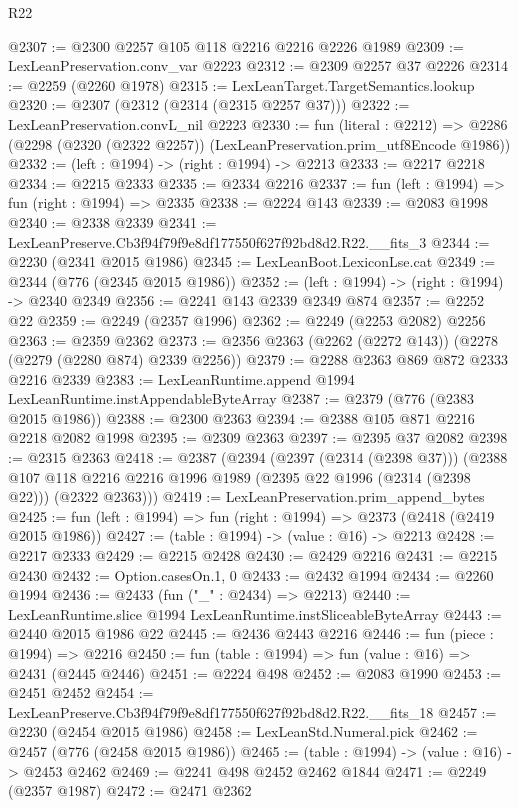 \begin{lexlean}{R22}
\begin{coremodule}
@2307 := @2300 @2257 @105 @118 @2216 @2216 @2226 @1989
@2309 := LexLeanPreservation.conv_var @2223
@2312 := @2309 @2257 @37 @2226
@2314 := @2259 (@2260 @1978)
@2315 := LexLeanTarget.TargetSemantics.lookup
@2320 := @2307 (@2312 (@2314 (@2315 @2257 @37)))
@2322 := LexLeanPreservation.convL_nil @2223
@2330 := fun (literal : @2212) =>
  @2286 (@2298 (@2320 (@2322 @2257)) (LexLeanPreservation.prim_utf8Encode @1986))
@2332 := (left : @1994) -> (right : @1994) -> @2213
@2333 := @2217 @2218
@2334 := @2215 @2333
@2335 := @2334 @2216
@2337 := fun (left : @1994) => fun (right : @1994) => @2335
@2338 := @2224 @143
@2339 := @2083 @1998
@2340 := @2338 @2339
@2341 := LexLeanPreserve.Cb3f94f79f9e8df177550f627f92bd8d2.R22.__fits_3
@2344 := @2230 (@2341 @2015 @1986)
@2345 := LexLeanBoot.LexiconLse.cat
@2349 := @2344 (@776 (@2345 @2015 @1986))
@2352 := (left : @1994) -> (right : @1994) -> @2340 @2349
@2356 := @2241 @143 @2339 @2349 @874
@2357 := @2252 @22
@2359 := @2249 (@2357 @1996)
@2362 := @2249 (@2253 @2082) @2256
@2363 := @2359 @2362
@2373 := @2356 @2363 (@2262 (@2272 @143)) (@2278 (@2279 (@2280 @874) @2339 @2256))
@2379 := @2288 @2363 @869 @872 @2333 @2216 @2339
@2383 := LexLeanRuntime.append @1994 LexLeanRuntime.instAppendableByteArray
@2387 := @2379 (@776 (@2383 @2015 @1986))
@2388 := @2300 @2363
@2394 := @2388 @105 @871 @2216 @2218 @2082 @1998
@2395 := @2309 @2363
@2397 := @2395 @37 @2082
@2398 := @2315 @2363
@2418 := @2387
    (@2394
      (@2397 (@2314 (@2398 @37)))
      (@2388 @107 @118 @2216 @2216 @1996 @1989 (@2395 @22 @1996 (@2314 (@2398 @22))) (@2322 @2363)))
@2419 := LexLeanPreservation.prim_append_bytes
@2425 := fun (left : @1994) => fun (right : @1994) => @2373 (@2418 (@2419 @2015 @1986))
@2427 := (table : @1994) -> (value : @16) -> @2213
@2428 := @2217 @2333
@2429 := @2215 @2428
@2430 := @2429 @2216
@2431 := @2215 @2430
@2432 := Option.casesOn.{1, 0}
@2433 := @2432 @1994
@2434 := @2260 @1994
@2436 := @2433 (fun ("_" : @2434) => @2213)
@2440 := LexLeanRuntime.slice @1994 LexLeanRuntime.instSliceableByteArray
@2443 := @2440 @2015 @1986 @22
@2445 := @2436 @2443 @2216
@2446 := fun (piece : @1994) => @2216
@2450 := fun (table : @1994) => fun (value : @16) => @2431 (@2445 @2446)
@2451 := @2224 @498
@2452 := @2083 @1990
@2453 := @2451 @2452
@2454 := LexLeanPreserve.Cb3f94f79f9e8df177550f627f92bd8d2.R22.__fits_18
@2457 := @2230 (@2454 @2015 @1986)
@2458 := LexLeanStd.Numeral.pick
@2462 := @2457 (@776 (@2458 @2015 @1986))
@2465 := (table : @1994) -> (value : @16) -> @2453 @2462
@2469 := @2241 @498 @2452 @2462 @1844
@2471 := @2249 (@2357 @1987)
@2472 := @2471 @2362

\end{coremodule}
\end{lexlean}
